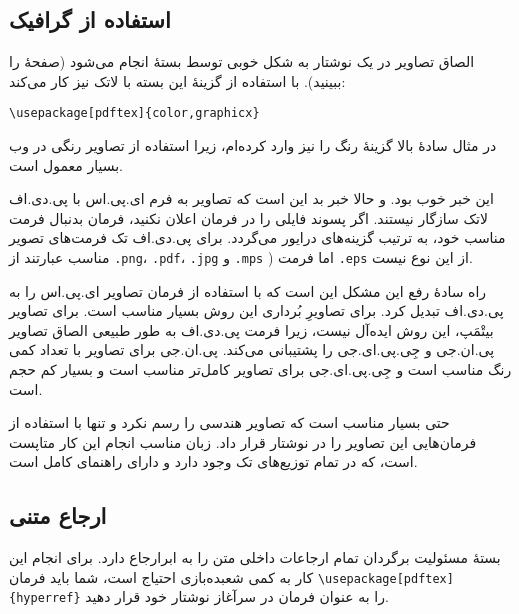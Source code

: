 \subsection{استفاده از گرافیک}
\label{ssec:pdfgraph}

الصاق تصاویر در یک نوشتار‌ به شکل خوبی توسط بستهٔ  انجام می‌شود 
(صفحهٔ \pageref{eps} را ببینید).
با استفاده از گزینهٔ  
این بسته با لاتک نیز کار می‌کند:

\begin{code}
\begin{verbatim}
\usepackage[pdftex]{color,graphicx}
\end{verbatim}
\end{code}

در مثال سادهٔ بالا گزینهٔ رنگ را نیز وارد کرده‌ام، زیرا استفاده از تصاویر رنگی در وب بسیار معمول است.

این خبر خوب بود. و حالا خبر بد این است که تصاویر به فرم ای.پی.اس با پی.دی.اف لاتک سازگار نیستند. اگر پسوند فایلی را در فرمان  
اعلان نکنید، فرمان   بدنبال فرمت مناسب خود، به ترتیب گزینه‌های درایور می‌گردد. برای پی.دی.اف تک فرمت‌های تصویر مناسب عبارتند از \texttt{.png}، \texttt{.pdf}، \texttt{.jpg} و \texttt{.mps}%
\Footnote{\MP})
 اما فرمت \texttt{.eps} از این نوع نیست.

راه سادهٔ رفع این مشکل این است که با استفاده از فرمان  تصاویر ای.پی.اس را به پی.دی.اف تبدیل کرد. برای تصاویرِ بُرداری 
 این روش بسیار مناسب است. برای تصاویر بیتْمَپ، این روش ایده‌آل نیست،  زیرا فرمت پی.دی.اف به طور طبیعی الصاق تصاویر پی.ان.جی و جِی.پی.ای.جی را پشتیبانی می‌کند. پی.ان.جی برای تصاویر با تعداد  کمی رنگ مناسب است و جِی.پی.ای.جی برای تصاویر کامل‌تر مناسب است و بسیار کم حجم است.
 
حتی بسیار مناسب است که تصاویر هندسی را رسم نکرد و تنها با استفاده از فرمان‌هایی این تصاویر را در نوشتار‌ قرار داد. زبان مناسب انجام این کار 
 متاپست  است، که در تمام توزیع‌های تک وجود دارد و دارای راهنمای کامل است.

\subsection{ارجاع متنی}
\label{ssec:pdfhyperref}

بستهٔ  مسئولیت برگردان تمام ارجاعات داخلی متن را به ابرارجاع دارد. برای انجام این کار به کمی شعبده‌بازی احتیاج است، شما باید فرمان 
\verb+\usepackage[pdftex]{hyperref}+ را به عنوان  
فرمان در سرآغاز نوشتار‌ خود قرار دهید.

